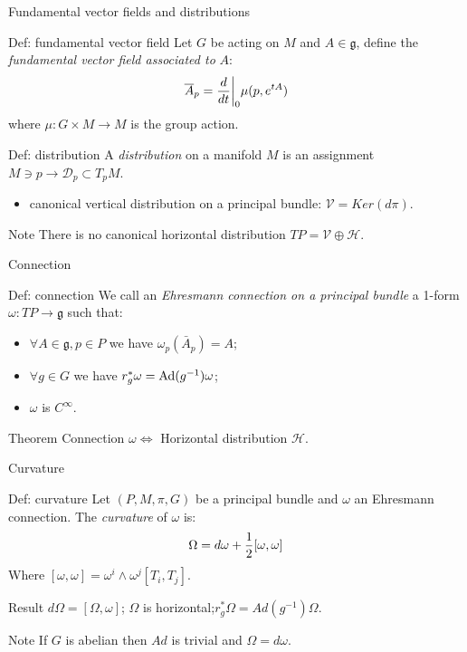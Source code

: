 \documentclass{beamer}
\begin{document}
\begin{frame}{Fundamental vector fields and distributions}
	\begin{exampleblock}{Def: fundamental vector field}
		Let $G$ be acting on $M$ and $A\in\mathfrak{g}$, define the \textit{fundamental vector field associated to} $A$:
		$$\overline{A}_p={d\over dt}\bigg|_0 \mu(p,e^{tA})$$
		where $\mu:G\times M\rightarrow M$ is the group action.
	\end{exampleblock}
	\begin{exampleblock}{Def: distribution}
		A \textit{distribution} on a manifold $M$ is an assignment $M\ni p\rightarrow \mathcal{D}_p\subset T_pM$.
		\begin{itemize}
			\item canonical vertical distribution on a principal bundle: $\mathcal{V}=Ker(d\pi)$.
		\end{itemize}
	\end{exampleblock}
	\begin{alertblock}{Note}
		There is no canonical horizontal distribution $TP=\mathcal{V}\oplus\mathcal{H}$.
	\end{alertblock}
\end{frame}
\begin{frame}{Connection}
	\begin{exampleblock}{Def: connection}
			We call an \textit{Ehresmann connection on a principal bundle} a 1-form $\omega:TP\rightarrow \mathfrak{g}$ such that:
		\begin{itemize}
			\item $\forall A\in\mathfrak{g}, p\in P$ we have $\omega_{p}(\bar{A}_{p})=A$;
			\item $\forall g\in G$ we have $r^*_g\omega=\hbox{Ad}(g^{-1})\omega$;
			\item $\omega$ is $C^\infty$.
		\end{itemize}
	\end{exampleblock}
	\begin{alertblock}{Theorem}
		Connection $\omega\Longleftrightarrow$ Horizontal distribution $\mathcal{H}$.
	\end{alertblock}
\end{frame}
\begin{frame}{Curvature}
	\begin{exampleblock}{Def: curvature}
		Let $(P,M,\pi,G)$ be a principal bundle and $\omega$ an Ehresmann connection. The \textit{curvature} of $\omega$ is:
		$$\Omega=d\omega+{1\over 2}[\omega,\omega]$$
		Where $[\omega,\omega]=\omega^i\wedge\omega^j[T_i,T_j]$.
	\end{exampleblock}
	\begin{block}{Result}
		$d\Omega=[\Omega,\omega]$; $\Omega$ is horizontal;$r^*_g\Omega=Ad(g^{-1})\Omega$.
	\end{block}		
	\begin{alertblock}{Note}
		If $G$ is abelian then $Ad$ is trivial and $\Omega=d\omega$.
	\end{alertblock}
\end{frame}
\end{document}
